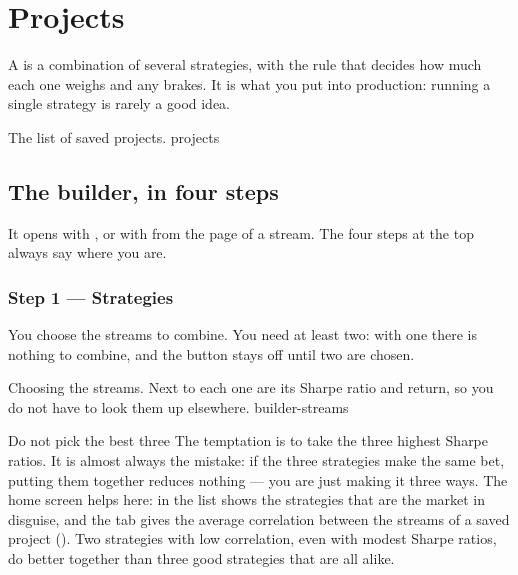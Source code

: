 \chapter{Projects}\label{cap:projects}

A  is a combination of several strategies, with the rule that
decides how much each one weighs and any brakes. It is what you put into
production: running a single strategy is rarely a good idea.

  {The list of saved projects.}
  {projects}

\section{The builder, in four steps}\label{sez:builder}

It opens with , or with  from the page of a stream. The four steps at the top always say
where you are.

\subsection{Step 1 --- Strategies}

You choose the streams to combine. You need at least two: with one there is
nothing to combine, and the  button stays off until two are
chosen.

  {Choosing the streams. Next to each one are its Sharpe ratio and return, so
   you do not have to look them up elsewhere.}
  {builder-streams}

\begin{perche}{Do not pick the best three}
The temptation is to take the three highest Sharpe ratios. It is almost
always the mistake: if the three strategies make the same bet, putting them
together reduces nothing --- you are just making it three ways. The home
screen helps here:  in the list shows the strategies that are
the market in disguise, and the  tab gives the average
correlation between the streams of a saved project ().
Two strategies with low correlation, even with modest Sharpe ratios, do
better together than three good strategies that are all alike.
\end{perche}


